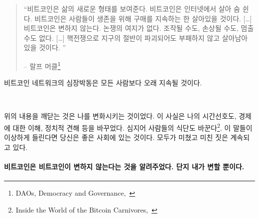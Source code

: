\begin{quotation}\begin{samepage}
\enquote{비트코인은 삶의 새로운 형태를 보여준다. 비트코인은 인터넷에서 살아 숨 쉰다. 비트코인은
사람들이 생존을 위해 구매를 지속하는 한 살아있을 것이다. [\ldots] 비트코인은 변하지 않는다. 논쟁의 여지가 없다.
조작될 수도, 손상될 수도, 멈출 수도 없다. [\ldots] 핵전쟁으로 지구의 절반이 파괴되어도 
부패하지 않고 살아남아 있을 것이다. }
\begin{flushright} -- 랄프 머클\footnote{DAOs, Democracy and
Governance,~\cite{merkle-dao}}
\end{flushright}\end{samepage}\end{quotation}
 

비트코인 네트워크의 심장박동은 모든 사람보다 오래 지속될 것이다.

~


위의 내용을 깨닫는 것은 나를 변화시키는 것이었다. 
이 사실은 나의 시간선호도, 경제에 대한 이해, 정치적 견해 등을 바꾸었다. 
심지어 사람들의 식단도 바꾼다\footnote{Inside the World of the Bitcoin Carnivores,~\cite{carnivores}}. 
이 말들이 이상하게 들린다면 당신은 좋은 사회에 있는 것이다. 
모두가 미쳤고 미친 짓은 계속되고 있다.
~

\paragraph{비트코인은 비트코인이 변하지 않는다는 것을 알려주었다. 단지 내가 변할 뿐이다.}

